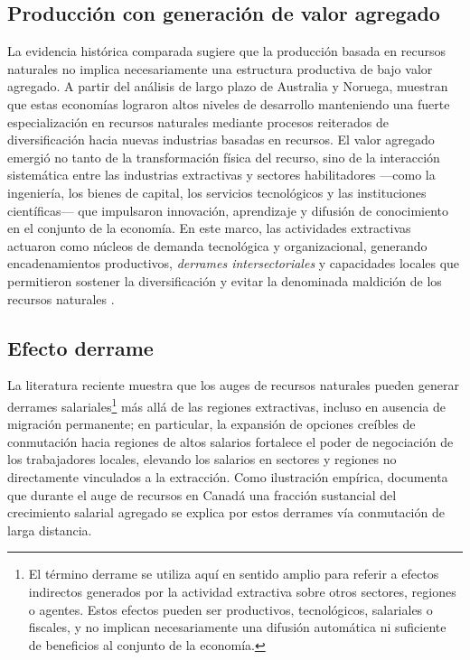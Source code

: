 \documentclass[../../PTFM.tex]{subfiles}
\begin{document}
	\subsection{Producción con generación de valor agregado}
	\label{subsec:produccion-valor-agregado}
	
	La evidencia histórica comparada sugiere que la producción basada en recursos naturales no implica necesariamente una estructura productiva de bajo valor agregado. A partir del análisis de largo plazo de Australia y Noruega, \textcite{Ville2013} muestran que estas economías lograron altos niveles de desarrollo manteniendo una fuerte especialización en recursos naturales mediante procesos reiterados de diversificación hacia nuevas industrias basadas en recursos. El valor agregado emergió no tanto de la transformación física del recurso, sino de la interacción sistemática entre las industrias extractivas y sectores habilitadores —como la ingeniería, los bienes de capital, los servicios tecnológicos y las instituciones científicas— que impulsaron innovación, aprendizaje y difusión de conocimiento en el conjunto de la economía. En este marco, las actividades extractivas actuaron como núcleos de demanda tecnológica y organizacional, generando encadenamientos productivos, \textit{derrames intersectoriales} y capacidades locales que permitieron sostener la diversificación y evitar la denominada maldición de los recursos naturales \parencite{Ville2013}.
	
	\subsection{Efecto derrame}
	\label{subsec:efecto-derrame}
	
	La literatura reciente muestra que los auges de recursos naturales pueden generar derrames salariales\footnote{El término derrame se utiliza aquí en sentido amplio para referir a efectos indirectos generados por la actividad extractiva sobre otros sectores, regiones o agentes. Estos efectos pueden ser productivos, tecnológicos, salariales o fiscales, y no implican necesariamente una difusión automática ni suficiente de beneficios al conjunto de la economía.} más allá de las regiones extractivas, incluso en ausencia de migración permanente; en particular, la expansión de opciones creíbles de conmutación hacia regiones de altos salarios fortalece el poder de negociación de los trabajadores locales, elevando los salarios en sectores y regiones no directamente vinculados a la extracción. Como ilustración empírica, \textcite{Green2017} documenta que durante el auge de recursos en Canadá una fracción sustancial del crecimiento salarial agregado se explica por estos derrames vía conmutación de larga distancia.
	
\end{document}
